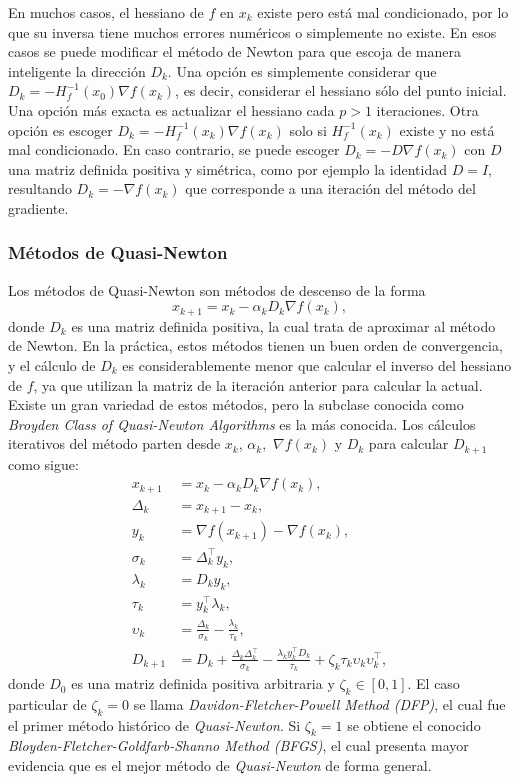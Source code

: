 En muchos casos, el hessiano de \(f\) en \(x_k\) existe pero está mal condicionado, por lo que su inversa tiene muchos errores numéricos o simplemente no existe. En esos casos se puede modificar el método de Newton para que escoja de manera inteligente la dirección \(D_k\). Una opción es simplemente considerar que \(D_k = -H_f^{-1}(x_0) \nabla f(x_k)\), es decir, considerar el hessiano sólo del punto inicial. Una opción más exacta es actualizar el hessiano cada \(p > 1\) iteraciones. Otra opción es escoger \(D_k = -H_f^{-1}(x_k) \nabla f(x_k)\) solo si \(H_f^{-1}(x_k)\) existe y no está mal condicionado. En caso contrario, se puede escoger \(D_k = -D \nabla f(x_k)\) con \(D\) una matriz definida positiva y simétrica, como por ejemplo la identidad \(D = I\), resultando \(D_k = -\nabla f(x_k)\) que corresponde a una iteración del método del gradiente.

\subsubsection{Métodos de Quasi-Newton}

Los métodos de Quasi-Newton son métodos de descenso de la forma
\begin{equation*}
x_{k+1} = x_k - \alpha_k D_k \nabla f(x_k),
\end{equation*}
donde \(D_k\) es una matriz definida positiva, la cual trata de aproximar al método de Newton. En la práctica, estos métodos tienen un buen orden de convergencia, y el cálculo de \(D_k\) es considerablemente menor que calcular el inverso del hessiano de \(f\), ya que utilizan la matriz de la iteración anterior para calcular la actual. Existe un gran variedad de estos métodos, pero la subclase conocida como \emph{Broyden Class of Quasi-Newton Algorithms} es la más conocida. Los cálculos iterativos del método parten desde \(x_k\), \(\alpha_k,\) \(\nabla f(x_k)\) y \(D_k\) para calcular \(D_{k+1}\) como sigue:
\begin{align*}
x_{k+1}		&= x_k - \alpha_k D_k \nabla f(x_k),\\
\Delta_k	&= x_{k+1} - x_k,\\
y_k			&= \nabla f(x_{k+1}) - \nabla f(x_k), \\
\sigma_k	&= \Delta_k^{\top} y_k,\\
\lambda_k	&= D_k y_k,\\
\tau_k		&= y_k^{\top} \lambda_k,\\
\upsilon_k	&= \frac{\Delta_k}{\sigma_k} - \frac{\lambda_k}{\tau_k}, \\
D_{k+1}		&= D_k + \frac{\Delta_k \Delta_k^{\top}}{\sigma_k} - \frac{\lambda_k y_k^{\top} D_k}{\tau_k} + \zeta_k \tau_k \upsilon_k \upsilon_k^{\top},
\end{align*}
donde \(D_0\) es una matriz definida positiva arbitraria y \(\zeta_k \in [0, 1]\). El caso particular de \(\zeta_k = 0\) se llama \emph{Davidon-Fletcher-Powell Method (DFP)}, el cual fue el primer método histórico de \emph{Quasi-Newton}. Si \(\zeta_k = 1\) se obtiene el conocido \emph{Bloyden-Fletcher-Goldfarb-Shanno Method (BFGS)}, el cual presenta mayor evidencia que es el mejor método de \emph{Quasi-Newton} de forma general.

